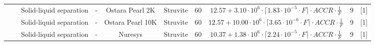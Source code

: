 \documentclass[]{elsarticle}
\begin{document}
\begin{table}
{\begin{threeparttable}
\begin{tabular}{@{}cccccccccc@{}}
				& & Solid-liquid separation
				&     -
				& Ostara Pearl 2K                                                                             & Struvite                                                                          & 60                                                                                    & $12.57 + 3.10 \cdot 10^6 \cdot \lceil 1.83 \cdot 10^{-5} \cdot F \rceil \cdot ACCR \cdot \frac{1}{F}$                                 & 9                                                            &  [1]        \\
				& & Solid-liquid separation
				&      -
				& Ostara Pearl 10K                                                                             & Struvite                                                                          & 60                                                                                    &  $12.57 + 10.00 \cdot 10^6 \cdot \lceil 3.65 \cdot 10^{-6} \cdot F \rceil \cdot ACCR \cdot \frac{1}{F}$                                  & 9                                                            &   [1]       \\
				&                                                                                                                                                         & Solid-liquid separation
				&              -
				& Nuresys                                                                                  & Struvite                                                                          & 60                                                                                    & $10.37 + 1.38 \cdot 10^6 \cdot \lceil 2.24 \cdot 10^{-5} \cdot F \rceil \cdot ACCR \cdot \frac{1}{F}$                                  & 9                                                            & [1]         \\

\end{tabular}
\end{threeparttable}}
\end{table}
\end{document}
